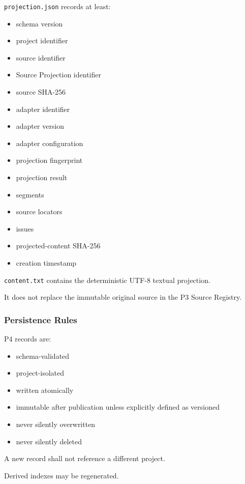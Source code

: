 \texttt{projection.json} records at least:

\begin{itemize}
\tightlist
\item
  schema version
\item
  project identifier
\item
  source identifier
\item
  Source Projection identifier
\item
  source SHA-256
\item
  adapter identifier
\item
  adapter version
\item
  adapter configuration
\item
  projection fingerprint
\item
  projection result
\item
  segments
\item
  source locators
\item
  issues
\item
  projected-content SHA-256
\item
  creation timestamp
\end{itemize}

\texttt{content.txt} contains the deterministic UTF-8 textual projection.

It does not replace the immutable original source in the P3 Source Registry.

\hypertarget{persistence-rules}{%
\subsubsection{Persistence Rules}\label{persistence-rules}}

P4 records are:

\begin{itemize}
\tightlist
\item
  schema-validated
\item
  project-isolated
\item
  written atomically
\item
  immutable after publication unless explicitly defined as versioned
\item
  never silently overwritten
\item
  never silently deleted
\end{itemize}

A new record shall not reference a different project.

Derived indexes may be regenerated.

